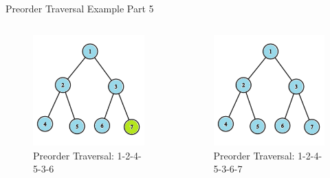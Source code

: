 \documentclass[aspectratio=169]{beamer}%
\begin{document}
\begin{frame}{Preorder Traversal Example Part 5}
    \begin{columns}
        \begin{column}{0.32\textwidth}
            \begin{figure}
                \centering
                \includegraphics[width = .9\linewidth]{tree-pre 13.png}
                \caption{Preorder Traversal: 1-2-4-5-3-6}
            \end{figure}
        \end{column}
        \hfill
        \begin{column}{0.32\textwidth}
            \begin{figure}
                \centering
                \includegraphics[width = .9\linewidth]{tree-pre 14.png}
                \caption{Preorder Traversal: 1-2-4-5-3-6-7}
            \end{figure}
        \end{column}
    \end{columns}
\end{frame}
\end{document}
